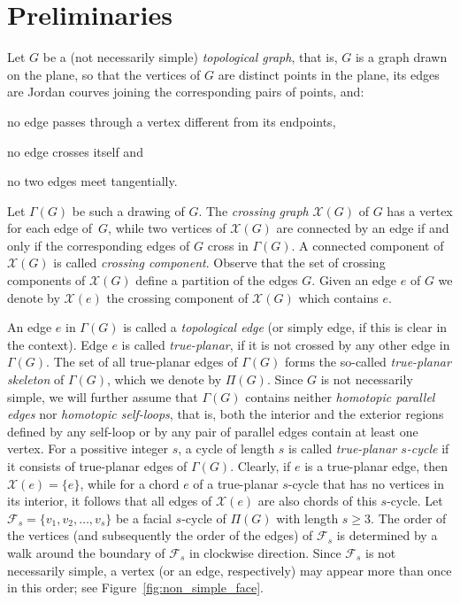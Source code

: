 \section{Preliminaries}
\label{sec:preliminaries}

Let $G$ be a (not necessarily simple) \emph{topological graph}, that is, $G$ is a graph drawn on the plane, so that the vertices of $G$ are distinct points in the plane, its edges are Jordan courves joining the corresponding pairs of points, and:%
%
\begin{inparaenum}[(i)]
\item no edge passes through a vertex different from its endpoints, 
\item no edge crosses itself and 
\item no two edges meet tangentially.
\end{inparaenum}
Let $\Gamma(G)$ be such a drawing of $G$. The \emph{crossing graph} $\mathcal{X}(G)$ of $G$ has a vertex for each edge of~$G$, while two vertices of $\mathcal{X}(G)$ are connected by an edge if and only if the corresponding edges of $G$ cross in $\Gamma(G)$. A connected component of $\mathcal{X}(G)$ is called \emph{crossing component}. Observe that the set of crossing components of $\mathcal{X}(G)$ define a partition of the edges $G$. Given an edge $e$ of $G$ we denote by $\mathcal{X}(e)$ the crossing component of $\mathcal{X}(G)$ which contains $e$. 

An edge $e$ in $\Gamma(G)$ is called a \emph{topological edge} (or simply edge, if this is clear in the context). Edge $e$ is called \emph{true-planar}, if it is not crossed by any other edge in $\Gamma(G)$. The set of all true-planar edges of $\Gamma(G)$ forms the so-called \emph{true-planar skeleton} of $\Gamma(G)$, which we denote by $\Pi(G)$. Since $G$ is not necessarily simple, we will further assume that $\Gamma(G)$ contains neither \emph{homotopic parallel edges} nor \emph{homotopic self-loops}, that is, both the interior and the exterior regions defined by any self-loop or by any pair of parallel edges contain at least one vertex. For a possitive integer $s$, a cycle of length $s$ is called \emph{true-planar $s$-cycle} if it consists of true-planar edges of $\Gamma(G)$. Clearly, if $e$ is a true-planar edge, then $\mathcal{X}(e)=\{e\}$, while for a chord $e$ of a true-planar $s$-cycle that has no vertices in its interior, it follows that all edges of $\mathcal{X}(e)$ are also chords of this $s$-cycle. Let $\mathcal{F}_s=\{v_1,v_2,\ldots,v_s\}$ be a facial $s$-cycle of $\Pi(G)$ with length $s \geq 3$.  The order of the vertices (and subsequently the order of the edges) of $\mathcal{F}_s$ is determined by a walk around the boundary of $\mathcal{F}_s$ in clockwise direction. Since $\mathcal{F}_s$ is not necessarily simple, a vertex (or an edge, respectively) may appear more than once in this order; see Figure~\ref{fig:non_simple_face}.

